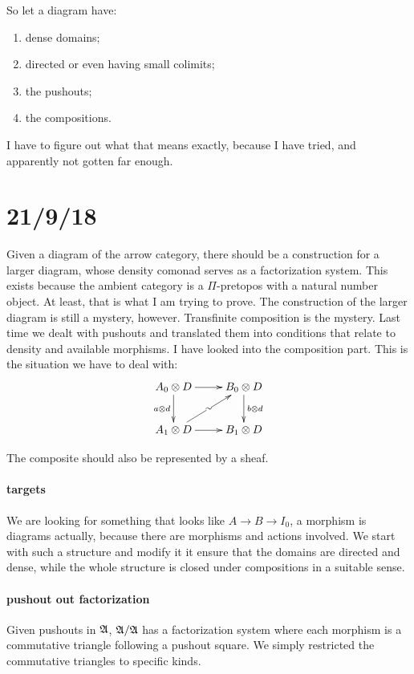\documentclass[csh.tex]{subfiles}
\begin{document}
So let a diagram have:
\begin{enumerate}
\item dense domains;
\item directed or even having small colimits;
\item the pushouts;
\item the compositions.
\end{enumerate}
I have to figure out what that means exactly, because I have tried, and apparently not gotten far enough.

\section{21/9/18}
Given a diagram of the arrow category, there should be a construction for a larger diagram, whose density comonad serves as a factorization system. This exists because the ambient category is a $\Pi$-pretopos with a natural number object. At least, that is what I am trying to prove.
The construction of the larger diagram is still a mystery, however.
Transfinite composition is the mystery. Last time we dealt with pushouts and translated them into conditions that relate to density and available morphisms.
I have looked into the composition part. 
This is the situation we have to deal with:
\[\xymatrix{
A_0\otimes D\ar[d]_{a\otimes d} \ar[r] & B_0\otimes D \ar[d]^{b\otimes d} \\
A_1\otimes D\ar[ur]|{\sim} \ar[r] & B_1\otimes D
}\]

The composite should also be represented by a sheaf.

\paragraph{targets}
We are looking for something that looks like $A\to B\to I_0$, a morphism is diagrams actually, because there are morphisms and actions involved. We start with such a structure and modify it it ensure that the domains are directed and dense, while the whole structure is closed under compositions in a suitable sense.

\paragraph{pushout out factorization}
Given pushouts in $\mathfrak A$, $\mathfrak A/\mathfrak A$ has a factorization system where each morphism is a commutative triangle following a pushout square. We simply restricted the commutative triangles to specific kinds.
\end{document}
